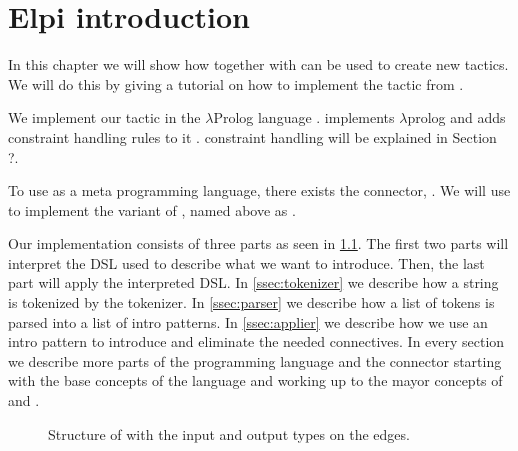 \documentclass[thesis.tex]{subfiles}
\begin{document}
\chapter{Elpi introduction}
In this chapter we will show how \elpi together with \ce can be used to create new tactics. We will do this by giving a tutorial on how to implement the  tactic from \iris.

We implement our tactic in the $\lambda$Prolog language \elpi \cite{dunchevELPIFastEmbeddable2015,guidiImplementingTypeTheory2019}. \elpi implements $\lambda$prolog \cite{millerHigherorderLogicProgramming1986,millerUniformProofsFoundation1991,belleanneePragmaticReconstructionLProlog1999,millerProgrammingHigherOrderLogic2012} and adds constraint handling rules to it \cite{monfroyConstraintHandlingRules2011}. constraint handling will be explained in Section ?.

To use \elpi as a \coq meta programming language, there exists the \elpi \coq connector, \ce \cite{tassiElpiExtensionLanguage2018}. We will use \ce to implement the \elpi variant of , named above as .

Our \elpi implementation  consists of three parts as seen in \cref{fig:eiintrosstruct}. The first two parts will interpret the DSL used to describe what we want to introduce. Then, the last part will apply the interpreted DSL. In \cref{ssec:tokenizer} we describe how a string is tokenized by the tokenizer. In \cref{ssec:parser} we describe how a list of tokens is parsed into a list of intro patterns. In \cref{ssec:applier} we describe how we use an intro pattern to introduce and eliminate the needed connectives. In every section we describe more parts of the \elpi programming language and the \ce connector starting with the base concepts of the language and working up to the mayor concepts of \elpi and \ce.
\begin{figure}
  \centering
  \caption{Structure of  with the input and output types on the edges.}
  \label{fig:eiintrosstruct}
\end{figure}
\end{document}
